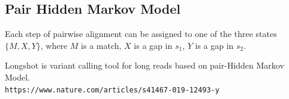 \documentclass[a4paper, 12pt]{article}
\theoremstyle{definition}
\theoremstyle{definition}
\theoremstyle{remark}
\begin{document}
\subsection{Pair Hidden Markov Model}
Each step of pairwise alignment can be assigned to one of 
the three states $\{ M, X, Y\}$, where $M$ is a match, 
$X$ is a gap in $s_1$, $Y$ is a gap in $s_2$.  



\newpage

\begin{thebibliography}{00}
    Longshot is variant calling tool for long reads based on pair-Hidden Markov Model.
    \\\texttt{https://www.nature.com/articles/s41467-019-12493-y}
\end{thebibliography}
\end{document}
